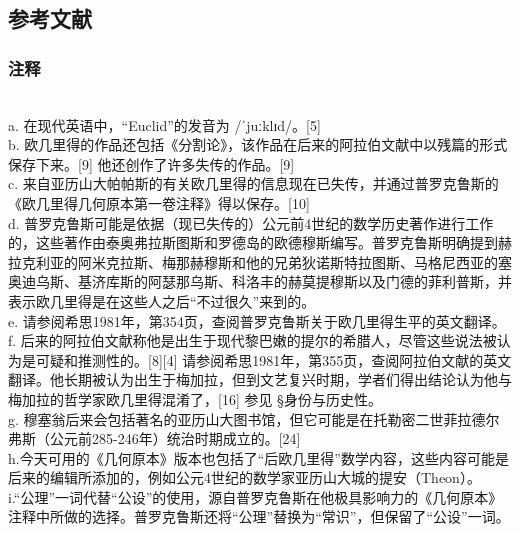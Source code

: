 \subsection{参考文献} 
\subsubsection{注释} \\
a. 在现代英语中，“Euclid”的发音为 /ˈjuːklɪd/。[5]\\  
b. 欧几里得的作品还包括《分割论》，该作品在后来的阿拉伯文献中以残篇的形式保存下来。[9] 他还创作了许多失传的作品。[9]\\  
c. 来自亚历山大帕帕斯的有关欧几里得的信息现在已失传，并通过普罗克鲁斯的《欧几里得几何原本第一卷注释》得以保存。[10]\\  
d. 普罗克鲁斯可能是依据（现已失传的）公元前4世纪的数学历史著作进行工作的，这些著作由泰奥弗拉斯图斯和罗德岛的欧德穆斯编写。普罗克鲁斯明确提到赫拉克利亚的阿米克拉斯、梅那赫穆斯和他的兄弟狄诺斯特拉图斯、马格尼西亚的塞奥迪乌斯、基济库斯的阿瑟那乌斯、科洛丰的赫莫提穆斯以及门德的菲利普斯，并表示欧几里得是在这些人之后“不过很久”来到的。\\  
e. 请参阅希思1981年，第354页，查阅普罗克鲁斯关于欧几里得生平的英文翻译。\\  
f. 后来的阿拉伯文献称他是出生于现代黎巴嫩的提尔的希腊人，尽管这些说法被认为是可疑和推测性的。[8][4] 请参阅希思1981年，第355页，查阅阿拉伯文献的英文翻译。他长期被认为出生于梅加拉，但到文艺复兴时期，学者们得出结论认为他与梅加拉的哲学家欧几里得混淆了，[16] 参见 §身份与历史性。\\  
g. 穆塞翁后来会包括著名的亚历山大图书馆，但它可能是在托勒密二世菲拉德尔弗斯（公元前285-246年）统治时期成立的。[24]\\
h.今天可用的《几何原本》版本也包括了“后欧几里得”数学内容，这些内容可能是后来的编辑所添加的，例如公元4世纪的数学家亚历山大城的提安（Theon）。\\  
i.“公理”一词代替“公设”的使用，源自普罗克鲁斯在他极具影响力的《几何原本》注释中所做的选择。普罗克鲁斯还将“公理”替换为“常识”，但保留了“公设”一词。\\

